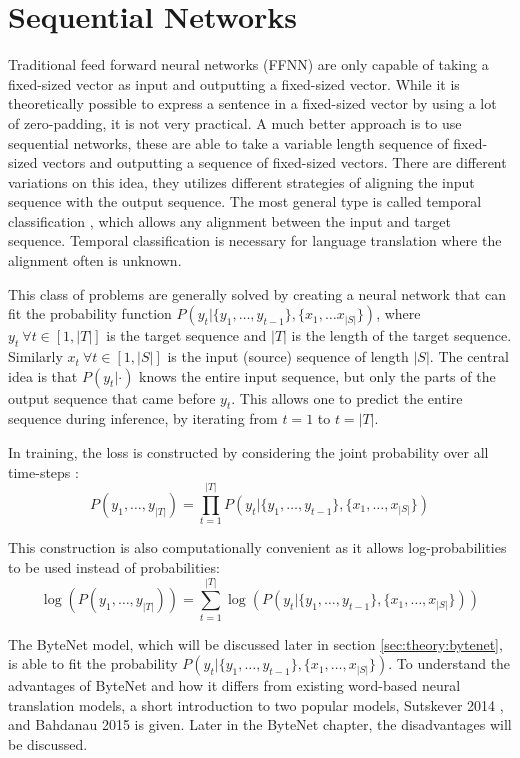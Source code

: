 \section{Sequential Networks}

Traditional feed forward neural networks (FFNN) are only capable of taking a fixed-sized vector as input and outputting a fixed-sized vector. While it is theoretically possible to express a sentence in a fixed-sized vector by using a lot of zero-padding, it is not very practical. A much better approach is to use sequential networks, these are able to take a variable length sequence of fixed-sized vectors and outputting a sequence of fixed-sized vectors. There are different variations on this idea, they utilizes different strategies of aligning the input sequence with the output sequence. The most general type is called temporal classification \cite{alexgraves}, which allows any alignment between the input and target sequence. Temporal classification is necessary for language translation where the alignment often is unknown.

This class of problems are generally solved by creating a neural network that can fit the probability function $P(y_t | \{y_1, \dots, y_{t-1}\}, \{x_1, \dots x_{|S|}\})$, where $y_t\ \forall t \in [1, |T|]$ is the target sequence and $|T|$ is the length of the target sequence. Similarly $x_t\ \forall t \in [1, |S|]$ is the input (source) sequence of length $|S|$. The central idea is that $P(y_t| \cdot)$ knows the entire input sequence, but only the parts of the output sequence that came before $y_t$. This allows one to predict the entire sequence during inference, by iterating from $t = 1$ to $t = |T|$.

In training, the loss is constructed by considering the joint probability over all time-steps \cite{alexgraves}:
\begin{equation}
P(y_1, \dots, y_{|T|}) = \prod_{t=1}^{|T|} P(y_t | \{y_1, \dots, y_{t-1}\}, \{x_1, \dots, x_{|S|}\})
\end{equation}

This construction is also computationally convenient as it allows log-probabilities to be used instead of probabilities:
\begin{equation}
\log(P(y_1, \dots, y_{|T|})) = \sum_{t=1}^{|T|} \log(P(y_t | \{y_1, \dots, y_{t-1}\}, \{x_1, \dots, x_{|S|}\}))
\end{equation}

The ByteNet model, which will be discussed later in section \ref{sec:theory:bytenet}, is able to fit the probability $P(y_t | \{y_1, \dots, y_{t-1}\}, \{x_1, \dots, x_{|S|}\})$. To understand the advantages of ByteNet and how it differs from existing word-based neural translation models, a short introduction to two popular models, Sutskever 2014 \cite{sutskever-2014-nmt}, and Bahdanau 2015 \cite{bahdanau-2015-nmt} is given. Later in the ByteNet chapter, the disadvantages will be discussed.

